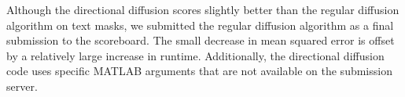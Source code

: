 Although the directional diffusion scores slightly better than the regular diffusion algorithm on text masks, we submitted the regular diffusion algorithm as a final submission to the scoreboard. The small decrease in mean squared error is offset by a relatively large increase in runtime. Additionally, the directional diffusion code uses specific MATLAB arguments that are not available on the submission server.